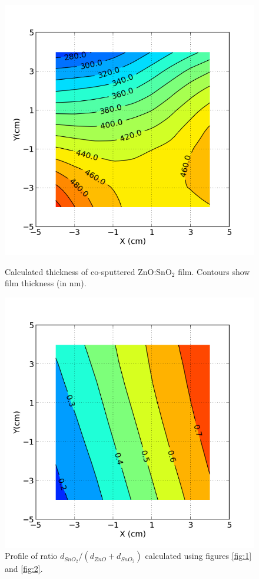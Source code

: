 \documentclass{article}
\begin{document}
\begin{figure}[ht]
\begin{minipage}[b]{0.45\linewidth}
\centering
\includegraphics[width=\textwidth]{ZTO_profile_pred.png}
\caption{\label{fig:3} Calculated thickness of co-sputtered ZnO:SnO$_2$ film. Contours show film thickness (in nm).}
\end{minipage}
\hspace{0.5cm}
\begin{minipage}[b]{0.45\linewidth}
\centering
\includegraphics[width=\textwidth]{x_profile.png}
\caption{\label{fig:4} Profile of ratio $d_{SnO_{2}}/(d_{ZnO}+d_{SnO_{2}})$ calculated using figures \ref{fig:1} and \ref{fig:2}.}
\end{minipage}
\end{figure}
\end{document}

